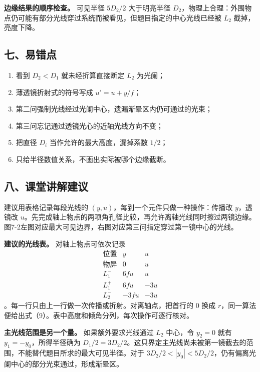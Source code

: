 \documentclass[12pt,a4paper,UTF8]{ctexart}
\newcommand{\tightlist}{\setlength{\itemsep}{0pt}\setlength{\parskip}{0pt}}
\begin{document}
\textbf{边缘结果的顺序检查。} 可见半径 \(5D_2/2\) 大于明亮半径
\(D_2\)，物理上合理：外围物点仍可能有部分光线穿过系统而被看见，但题目指定的中心光线已经被
\(L_2\) 截掉，亮度下降。

\subsection{七、易错点}\label{ux4e03ux6613ux9519ux70b9-6}

\begin{enumerate}
\def\labelenumi{\arabic{enumi}.}
\tightlist
\item
  看到 \(D_2<D_1\) 就未经折算直接断定 \(L_2\) 为光阑；
\item
  薄透镜折射式的符号写成 \(u'=u+y/f\)；
\item
  第二问强制光线经过光阑中心，遗漏渐晕区内仍可通过的光束；
\item
  第三问忘记通过透镜光心的近轴光线方向不变；
\item
  把直径 \(D_i\) 当作允许的最大高度，漏掉系数 \(1/2\)；
\item
  只给半径数值关系，不画出实际被哪个边缘截断。
\end{enumerate}

\subsection{八、课堂讲解建议}\label{ux516bux8bfeux5802ux8bb2ux89e3ux5efaux8bae-6}

建议用表格记录每段光线的 \((y,u)\)，每到一个元件只做一种操作：传播改
\(y\)，透镜改
\(u\)。先完成轴上物点的两项角孔径比较，再允许离轴光线同时擦过两镜边缘。图7-2左图对应最大可见边界，右图对应第三问指定穿过第一镜中心的光线。

\textbf{建议的光线表。} 对轴上物点可依次记录 \[
\begin{array}{c|c|c}
\text{位置}&y&u\\ \hline
\text{物屏}&0&u\\
L_1^-&6fu&u\\
L_1^+&6fu&-3u\\
L_2^-&-3fu&-3u
\end{array}
\] 。每一行只由上一行做一次传播或折射。对离轴点，把首行的 \(0\) 换成
\(r\)，同一算法便给出式（9）。表中高度和倾角分列，每次操作可逐行核对。

\textbf{主光线范围是另一个量。} 如果额外要求光线通过 \(L_2\) 中心，令
\(y_2=0\) 就有 \(y_1=-y_0\)，所得半径确为
\(D_1/2=3D_2/2\)。这只界定主光线尚未被第一镜截去的范围，不能替代题目所求的最大可见半径。对于
\(3D_2/2<|y_0|<5D_2/2\)，仍有偏离光阑中心的部分光束通过，形成渐晕区。
\end{document}
